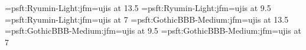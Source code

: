 
\jfont\tenmin=psft:Ryumin-Light:jfm=ujis at 13.5\jQ
\jfont\sevenmin=psft:Ryumin-Light:jfm=ujis at 9.5\jQ
\jfont\fivemin=psft:Ryumin-Light:jfm=ujis at 7\jQ
\jfont\tengt=psft:GothicBBB-Medium:jfm=ujis at 13.5\jQ
\jfont\sevengt=psft:GothicBBB-Medium:jfm=ujis at 9.5\jQ
\jfont\fivegt=psft:GothicBBB-Medium:jfm=ujis at 7\jQ

\let\mc=\tenmin
\let\gt=\tengt
\mc
{}



\endinput